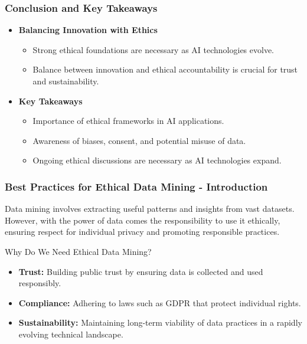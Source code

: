 \documentclass[aspectratio=169]{beamer}
\begin{document}
\begin{frame}[fragile]
    \frametitle{Conclusion and Key Takeaways}
    \begin{itemize}
        \item \textbf{Balancing Innovation with Ethics}
        \begin{itemize}
            \item Strong ethical foundations are necessary as AI technologies evolve.
            \item Balance between innovation and ethical accountability is crucial for trust and sustainability.
        \end{itemize}
        
        \item \textbf{Key Takeaways}
        \begin{itemize}
            \item Importance of ethical frameworks in AI applications.
            \item Awareness of biases, consent, and potential misuse of data.
            \item Ongoing ethical discussions are necessary as AI technologies expand.
        \end{itemize}
    \end{itemize}
\end{frame}

\begin{frame}[fragile]
    \frametitle{Best Practices for Ethical Data Mining - Introduction}
    Data mining involves extracting useful patterns and insights from vast datasets. However, with the power of data comes the responsibility to use it ethically, ensuring respect for individual privacy and promoting responsible practices.
    
    \begin{block}{Why Do We Need Ethical Data Mining?}
        \begin{itemize}
            \item \textbf{Trust:} Building public trust by ensuring data is collected and used responsibly.
            \item \textbf{Compliance:} Adhering to laws such as GDPR that protect individual rights.
            \item \textbf{Sustainability:} Maintaining long-term viability of data practices in a rapidly evolving technical landscape.
        \end{itemize}
    \end{block}
\end{frame}
\end{document}
